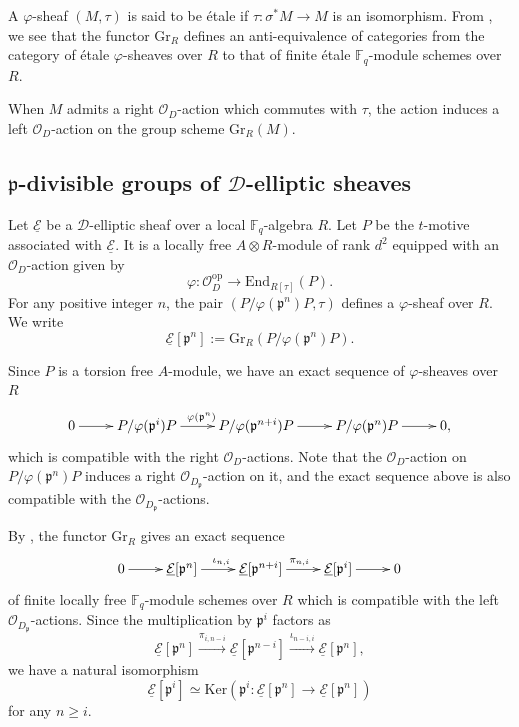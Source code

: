 \documentclass[10pt]{amsart}
\theoremstyle{plain}
\theoremstyle{definition}
\newcommand{\End}{\mathrm{End}}
\newcommand{\Ker}{\mathrm{Ker}}
\newcommand{\opp}{\mathrm{op}}
\newcommand{\cO}{\mathcal{O}}
\newcommand{\Gr}{\mathrm{Gr}}
\newcommand{\ucE}{\underline{\mathcal{E}}}
\newcommand{\bF}{\mathbb{F}}
\newcommand{\sD}{\mathscr{D}}
\newcommand{\frp}{\mathfrak{p}}
\begin{document}

A $\varphi$-sheaf $(M,\tau)$ is said to be \'{e}tale if $\tau:\sigma^*M\to M$ is an isomorphism. From \cite[Proposition 2.1]{Dri_F},
we see that the functor $\Gr_R$ defines an anti-equivalence of categories from the category of \'{e}tale $\varphi$-sheaves over $R$ to 
that of finite \'{e}tale $\bF_q$-module schemes over $R$.

When $M$ admits a right $\cO_D$-action which commutes with $\tau$, the action induces a left $\cO_D$-action on the group scheme $\Gr_R(M)$.






\subsection{$\frp$-divisible groups of $\sD$-elliptic sheaves}\label{SubsecDefPdiv}

Let $\ucE$ be a $\sD$-elliptic sheaf over a local $\bF_q$-algebra $R$.
Let $P$ be the $t$-motive associated with $\ucE$.
It is a locally free $A\otimes R$-module of rank $d^2$ equipped with an $\cO_D$-action given by
\[
\varphi:\cO_D^\opp\to \End_{R[\tau]}(P). 
\]
For any positive integer $n$, the pair $(P/\varphi(\frp^n)P,\tau)$ defines a $\varphi$-sheaf over $R$.
We write
\[
\ucE[\frp^n]:=\Gr_R(P/\varphi(\frp^n)P).
\]



Since $P$ is a torsion free $A$-module, we have an exact sequence of $\varphi$-sheaves over $R$
\[
\xymatrix{
	0 \ar[r]& P/\varphi(\frp^i) P \ar[r]^{\varphi(\frp^n)}& P/\varphi(\frp^{n+i})P\ar[r] & P/\varphi(\frp^n) P\ar[r] & 0,
}
\]
which is compatible with the right $\cO_D$-actions. Note that the $\cO_D$-action on $P/\varphi(\frp^n) P$ induces 
a right $\cO_{D_\frp}$-action on it, and the exact sequence above is also compatible with the $\cO_{D_\frp}$-actions.

By \cite[Proposition 2.1]{Dri_F}, the functor $\Gr_R$ gives an exact sequence
\[
\xymatrix{
	0 \ar[r]& \ucE[\frp^n] \ar[r]^{\iota_{n,i}} & \ucE[\frp^{n+i}]\ar[r]^{\pi_{n,i}} & \ucE[\frp^i]\ar[r] & 0
}
\]
of finite locally free $\bF_q$-module schemes over $R$ which is compatible with the left $\cO_{D_\frp}$-actions. 
Since the multiplication by
$\frp^i$ factors as
\begin{equation}\label{EqnPdiv}
	\ucE[\frp^n] \overset{\pi_{i,n-i}}{\to} \ucE[\frp^{n-i}] \overset{\iota_{n-i,i}}{\to} \ucE[\frp^n],
\end{equation}
we have a natural isomorphism
\[
\ucE[\frp^i] \simeq \Ker(\frp^i: \ucE[\frp^n]\to \ucE[\frp^n])
\]
for any $n\geq i$.
\end{document}
